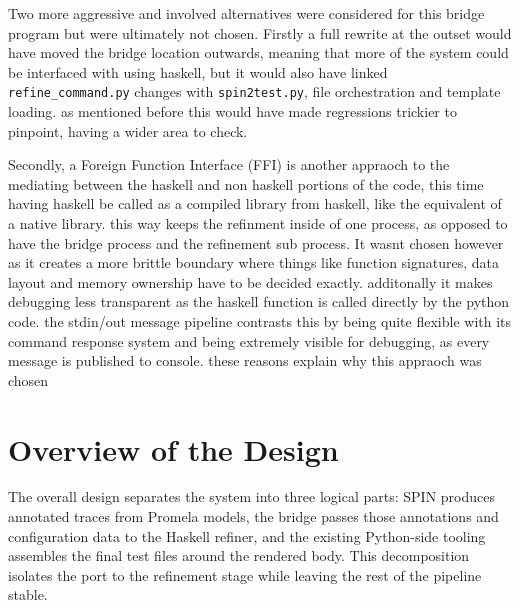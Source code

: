 Two more aggressive and involved alternatives were considered for this bridge program but were ultimately not chosen.
Firstly a full rewrite at the outset would have moved the bridge location outwards, meaning that more of the system could be interfaced with using haskell, but it would also have linked  \texttt{refine\_command.py} changes with \texttt{spin2test.py}, file orchestration and template loading. as mentioned before this would have made regressions trickier to pinpoint, having a wider area to check. 

Secondly, a Foreign Function Interface (FFI) is another appraoch to the mediating between the haskell and non haskell portions of the code, this time having haskell be called as a compiled library from haskell, like the equivalent of a native library.
this way keeps the refinment inside of one process, as opposed to have the bridge process and the refinement sub process. It wasnt chosen however as it creates a more brittle boundary where things like function signatures, data layout and memory ownership have to be decided exactly. additonally it makes debugging less transparent as the haskell function is called directly by the python code. the stdin/out message pipeline contrasts this by being quite flexible  with its command response system and being extremely visible for debugging, as every message is published to console. these reasons explain why this appraoch was chosen


\section{Overview of the Design}
\label{sec:OverviewOfDesign}


The overall design separates the system into three logical parts: SPIN produces annotated traces from Promela models, the bridge passes those annotations and configuration data to the Haskell refiner, and the existing Python-side tooling assembles the final test files around the rendered body. This decomposition isolates the port to the refinement stage while leaving the rest of the pipeline stable.

